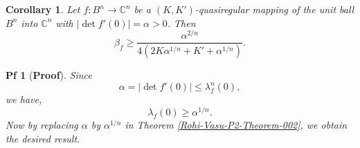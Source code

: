 \documentclass[10pt,a4paper]{amsart}
\newtheorem{cor}{Corollary}
\newtheorem{pf}{Pf}
\newcommand{\IC}{{\mathbb C}}
\begin{document}
\begin{cor}
Let $f:B^n\to \IC^n$ be a $(K,K')$-quasiregular mapping of the unit ball $B^n$ into $\IC^n$ with $|\operatorname{det} f'(0)|=\alpha>0$. Then
$$\beta_f\geq \frac{\alpha^{2/n}}{4(2K\alpha^{1/n}+K'+\alpha^{1/n})}.$$ 
\end{cor}

\begin{pf}[{\bf Proof}]
Since $$\alpha=|\operatorname{det} f'(0)|\leq \lambda_f^n(0),$$
we have,
     $$\lambda_f(0)\geq\alpha^{1/n}.$$
Now by replacing $\alpha$ by $\alpha^{1/n}$ in Theorem \ref{Rohi-Vasu-P2-Theorem-002}, we obtain the desired result.
\end{pf}
\end{document}
